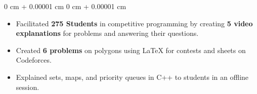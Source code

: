 \documentclass[9pt, letterpaper]{extarticle}
\newenvironment{highlights}{
    \begin{itemize}[
        topsep=0.06 cm,
        parsep=0.06 cm,
        partopsep=0pt,
        itemsep=0pt,
        leftmargin=0 cm + 10pt
    ]
}{
    \end{itemize}
} %
\newenvironment{onecolentry}{
    \begin{adjustwidth}{
        0 cm + 0.00001 cm
    }{
        0 cm + 0.00001 cm
    }
}{
    \end{adjustwidth}
} %
\newenvironment{twocolentry}[2][]{
    \onecolentry
    \def\secondColumn{#2}
    \setcolumnwidth{\fill, 4.5 cm}
    \begin{paracol}{2}
}{
    \switchcolumn \raggedleft \secondColumn
    \end{paracol}
    \endonecolentry
} %
\begin{document}
        \begin{onecolentry}
            \begin{highlights}
                \item Facilitated \textbf{275 Students} in competitive programming by creating \textbf{5 video explanations} for problems and answering their questions.
                \item Created \textbf{6 problems} on polygons using LaTeX for contests and sheets on Codeforces.
                \item Explained sets, maps, and priority queues in C++ to students in an offline session.
            \end{highlights}
        \end{onecolentry}




\end{document}
